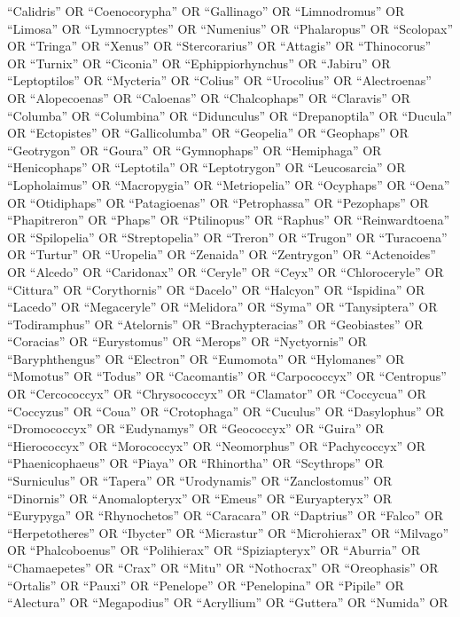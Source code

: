 \documentclass[
  number,
  review,
  onecolumn]{elsarticle}
\begin{document}
``Calidris'' OR ``Coenocorypha'' OR ``Gallinago'' OR ``Limnodromus'' OR
``Limosa'' OR ``Lymnocryptes'' OR ``Numenius'' OR ``Phalaropus'' OR
``Scolopax'' OR ``Tringa'' OR ``Xenus'' OR ``Stercorarius'' OR
``Attagis'' OR ``Thinocorus'' OR ``Turnix'' OR ``Ciconia'' OR
``Ephippiorhynchus'' OR ``Jabiru'' OR ``Leptoptilos'' OR ``Mycteria'' OR
``Colius'' OR ``Urocolius'' OR ``Alectroenas'' OR ``Alopecoenas'' OR
``Caloenas'' OR ``Chalcophaps'' OR ``Claravis'' OR ``Columba'' OR
``Columbina'' OR ``Didunculus'' OR ``Drepanoptila'' OR ``Ducula'' OR
``Ectopistes'' OR ``Gallicolumba'' OR ``Geopelia'' OR ``Geophaps'' OR
``Geotrygon'' OR ``Goura'' OR ``Gymnophaps'' OR ``Hemiphaga'' OR
``Henicophaps'' OR ``Leptotila'' OR ``Leptotrygon'' OR ``Leucosarcia''
OR ``Lopholaimus'' OR ``Macropygia'' OR ``Metriopelia'' OR ``Ocyphaps''
OR ``Oena'' OR ``Otidiphaps'' OR ``Patagioenas'' OR ``Petrophassa'' OR
``Pezophaps'' OR ``Phapitreron'' OR ``Phaps'' OR ``Ptilinopus'' OR
``Raphus'' OR ``Reinwardtoena'' OR ``Spilopelia'' OR ``Streptopelia'' OR
``Treron'' OR ``Trugon'' OR ``Turacoena'' OR ``Turtur'' OR ``Uropelia''
OR ``Zenaida'' OR ``Zentrygon'' OR ``Actenoides'' OR ``Alcedo'' OR
``Caridonax'' OR ``Ceryle'' OR ``Ceyx'' OR ``Chloroceryle'' OR
``Cittura'' OR ``Corythornis'' OR ``Dacelo'' OR ``Halcyon'' OR
``Ispidina'' OR ``Lacedo'' OR ``Megaceryle'' OR ``Melidora'' OR ``Syma''
OR ``Tanysiptera'' OR ``Todiramphus'' OR ``Atelornis'' OR
``Brachypteracias'' OR ``Geobiastes'' OR ``Coracias'' OR ``Eurystomus''
OR ``Merops'' OR ``Nyctyornis'' OR ``Baryphthengus'' OR ``Electron'' OR
``Eumomota'' OR ``Hylomanes'' OR ``Momotus'' OR ``Todus'' OR
``Cacomantis'' OR ``Carpococcyx'' OR ``Centropus'' OR ``Cercococcyx'' OR
``Chrysococcyx'' OR ``Clamator'' OR ``Coccycua'' OR ``Coccyzus'' OR
``Coua'' OR ``Crotophaga'' OR ``Cuculus'' OR ``Dasylophus'' OR
``Dromococcyx'' OR ``Eudynamys'' OR ``Geococcyx'' OR ``Guira'' OR
``Hierococcyx'' OR ``Morococcyx'' OR ``Neomorphus'' OR ``Pachycoccyx''
OR ``Phaenicophaeus'' OR ``Piaya'' OR ``Rhinortha'' OR ``Scythrops'' OR
``Surniculus'' OR ``Tapera'' OR ``Urodynamis'' OR ``Zanclostomus'' OR
``Dinornis'' OR ``Anomalopteryx'' OR ``Emeus'' OR ``Euryapteryx'' OR
``Eurypyga'' OR ``Rhynochetos'' OR ``Caracara'' OR ``Daptrius'' OR
``Falco'' OR ``Herpetotheres'' OR ``Ibycter'' OR ``Micrastur'' OR
``Microhierax'' OR ``Milvago'' OR ``Phalcoboenus'' OR ``Polihierax'' OR
``Spiziapteryx'' OR ``Aburria'' OR ``Chamaepetes'' OR ``Crax'' OR
``Mitu'' OR ``Nothocrax'' OR ``Oreophasis'' OR ``Ortalis'' OR ``Pauxi''
OR ``Penelope'' OR ``Penelopina'' OR ``Pipile'' OR ``Alectura'' OR
``Megapodius'' OR ``Acryllium'' OR ``Guttera'' OR ``Numida'' OR
\end{document}
